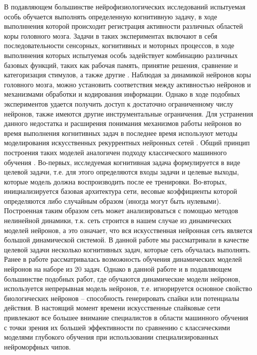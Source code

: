 \documentclass{article}
\begin{document}
В подавляющем большинстве нейрофизиологических исследований испытуемая особь обучается выполнять определенную когнитивную задачу, в ходе выполннения которой происходит регистрация активности различных областей коры головного мозга. Задачи в таких экспериментах включают в себя последовательности сенсорных, когнитивных и моторных процессов, в ходе выполннения которых испытуемая особь задействует комбинацию различных базовых функций, таких как рабочая память, принятие решения, сравнение и категоризация стимулов, а также другие \cite{mante2013context, funahashi1989mnemonic, zhang2019active, romo1999neuronal, britten1992analysis}. Наблюдая за динамикой нейронов коры головного мозга, можно установить соответствия между активностью нейронов и механизмами обработки и кодирования информации. Однако в ходе подобных экспериментов удается получить доступ к достаточно ограниченному числу нейронов, также имеются другие инструментальные ограничения. Для устранения данного недостатка и расширения понимания механизмов работы нейронов во время выполнения когнитивных задач в последнее время используют методы моделирования искусственных рекуррентных нейронных сетей \cite{barak2017recurrent, sussillo2014neural, maslennikov2020stimulus, maslennikov2019collective, maslennikov2021dynamics, pugavko2020dynamics}. Общий принцип построения таких моделей \cite{richards2019deep} аналогичен подходу классического машинного обучения \cite{Goodfellow-et-al-2016}. Во-первых, исследуемая когнитивная задача формулируется в виде целевой задачи, т.е. для этого определяются входы задачи и целевые выходы, которые модель должна воспроизводить после ее тренировки. Во-вторых, инициализируется базовая архитектура сети, весовые коэффициенты которой определяются либо случайным образом (иногда могут быть нулевыми). Построенная таким образом сеть может анализироваться с помощью методов нелинейной динамики, т.к. сеть строится в нашем случае из динамических моделей нейронов, а это означает, что вся искусственная нейронная сеть является большой динамической системой. В данной работе мы рассматривали в качестве целевой задачи несколько когнитивных задач, которые сеть обучалась выполнять. Ранее в работе \cite{yang2019task} рассматривалась возможность обучения динамических моделей нейронов на наборе из 20 задач. Однако в данной работе и в подавляющем большинстве подобных работ, где обучаются динамические модели нейронов, используется непрерывная модель нейронов, т.е. игнорируется основное свойство биологических нейронов -- способность генерировать спайки или потенциалы действия. В настоящий момент времени искусственные спайковые сети \cite{sussillo2009generating, nicola2017supervised, song2017reward, demin2018recurrent, pugavko2020dynamics, pugavko2020dynamicsisvvus, bellec2020solution} привлекают все большее внимание специалистов в области машинного обучения с точки зрения их большей эффективности по сравнению с классическими моделями глубокого обучения при использовании специализированных нейроморфных чипов\cite{davies2018loihi,markram2011introducing}.
\end{document}
